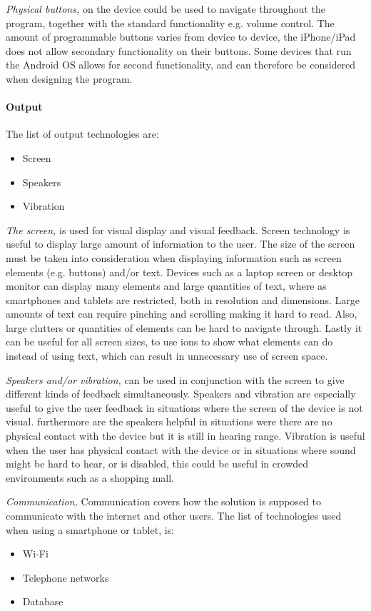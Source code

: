\emph{Physical buttons,} on the device could be used to navigate throughout the program, together with the standard functionality e.g. volume control. The amount of programmable buttons varies from device to device, the iPhone/iPad does not allow secondary functionality on their buttons. Some devices that run the Android OS allows for second functionality\cite{android_Rebind}, and can therefore be considered when designing the program.

\paragraph{Output}
The list of output technologies are:
\begin{itemize}
    \item Screen
    \item Speakers
    \item Vibration
\end{itemize}

\emph{The screen,} is used for visual display and visual feedback. Screen technology is useful to display large amount of information to the user.
The size of the screen must be taken into consideration when displaying information such as screen elements (e.g. buttons) and/or text.
Devices such as a laptop screen or desktop monitor can display many elements and large quantities of text, where as smartphones and tablets are restricted, both in resolution and dimensions. Large amounts of text can require pinching and scrolling making it hard to read. Also, large clutters or quantities of elements can be hard to navigate through. Lastly it can be useful for all screen sizes, to use ions to show what elements can do instead of using text, which can result in unnecessary use of screen space.

\emph{Speakers and/or vibration,} can be used in conjunction with the screen to give different kinds of feedback simultaneously.
Speakers and vibration are especially useful to give the user feedback in situations where the screen of the device is not visual. furthermore are the speakers helpful in situations were there are no physical contact with the device but it is still in hearing range. Vibration is useful when the user has physical contact with the device or in situations where sound might be hard to hear, or is disabled, this could be useful in crowded environments such as a shopping mall.     

\emph{Communication,} Communication covers how the solution is supposed to communicate with the internet and other users. The list of technologies used when using a smartphone or tablet, is:
\begin{itemize}
	\item Wi-Fi
	\item Telephone networks
    \item Database
\end{itemize}

